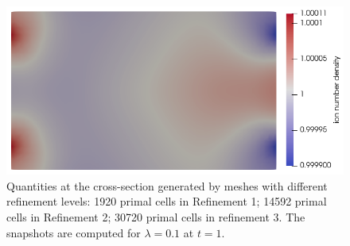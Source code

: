\documentclass{article}
\begin{document}
\begin{figure}
    \includegraphics[scale=0.27]{clip_ni_T-1_lambda-1e-1_32-3-4.png}
    \caption{Quantities at the cross-section generated by meshes with different refinement levels: 1920 primal cells in Refinement 1; 14592 primal cells in Refinement 2; 30720 primal cells in refinement 3. The snapshots are computed for $\lambda = 0.1$ at $t = 1$.}
    \label{fig:grid_study_3d_clip_lambda-1e-1}
\end{figure}
\end{document}
